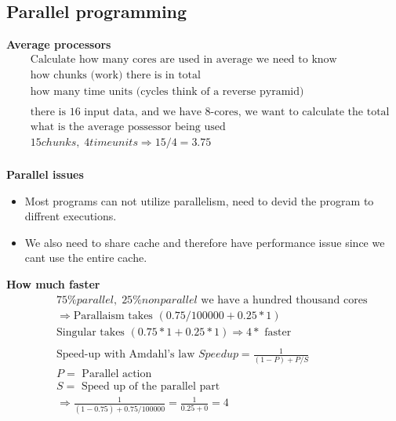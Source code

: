 \subsection{Parallel programming}


\textbf{Average processors}
\begin{align*}
  &\quad  \text{Calculate how many cores are used in average we need to know } \\
  &\quad  \text{how chunks (work) there is in total } \\
  &\quad  \text{how many time units (cycles think of a reverse pyramid)} \\
  &\quad  \\
  &\quad  \text{there is 16 input data, and we have 8-cores, we want to calculate the total sum} \\
  &\quad  \text{what is the average possessor being used} \\
  &\quad  15 chunks, \; 4 time units \Rightarrow 15/4 = 3.75 \\
\end{align*}

\textbf{Parallel issues}
\begin{itemize}
\item  Most programs can not utilize parallelism, need to devid the program to diffrent executions.
\item  We also need to share cache and therefore have performance issue since we cant use the entire cache.
\end{itemize}


\textbf{How much faster}
\begin{align*}
  &\quad  75\% parallel, \; 25\% non parallel \text{ we have a hundred thousand cores } \\
  &\quad  \Rightarrow  \text{Parallaism takes } (0.75/100000 + 0.25*1) \\
  &\quad  \text{Singular takes } (0.75*1 + 0.25*1)  \Rightarrow 4* \text{ faster} \\
  &\quad  \\
  &\quad  \text{Speed-up with Amdahl's law } Speedup=\frac{1}{(1-P)+P/S} \\
  &\quad  P= \text{ Parallel action} \\
  &\quad  S= \text{ Speed up of the parallel part} \\
  &\quad  \Rightarrow \frac{1}{(1-0.75)+0.75/100000} = \frac{1}{0.25+0}= 4 \\
\end{align*}



